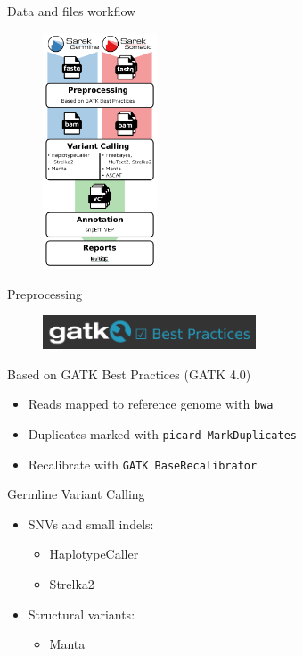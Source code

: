 \documentclass[usepdftitle=false]{beamer}
\begin{document}
\begin{frame}{Data and files workflow}
	\begin{figure}
		\includegraphics[height=7cm]{pictures/Sarek_workflow_3}
	\end{figure}
\end{frame}

\begin{frame}{Preprocessing}
	\begin{figure}
		\includegraphics[height=1cm]{pictures/GATKBP}
	\end{figure}
	Based on GATK Best Practices (GATK 4.0)

	\begin{itemize}
		\item Reads mapped to reference genome with \texttt{bwa}
		\item Duplicates marked with \texttt{picard MarkDuplicates}
		\item Recalibrate with \texttt{GATK BaseRecalibrator}
	\end{itemize}

\end{frame}

\begin{frame}{Germline Variant Calling}
	\begin{itemize}
		\item SNVs and small indels:
	\begin{itemize}
			\item HaplotypeCaller
			\item Strelka2
		\end{itemize}
		\item Structural variants:
		\begin{itemize}
			\item Manta
		\end{itemize}
	\end{itemize}
\end{frame}
\end{document}
